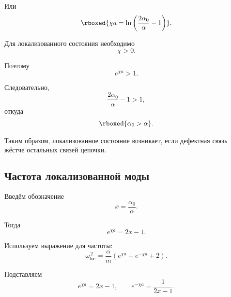 \documentclass[../final.tex]{subfiles}
\begin{document}
Или
%
\begin{equation*}
    \rboxed{
        \chi a
        =
        \ln
        \left(
            \frac{2\alpha_0}{\alpha}-1
        \right)
    }.
\end{equation*}

Для локализованного состояния необходимо
%
\begin{equation*}
    \chi>0.
\end{equation*}

Поэтому
%
\begin{equation*}
    e^{\chi a}>1.
\end{equation*}

Следовательно,
%
\begin{equation*}
    \frac{2\alpha_0}{\alpha}-1>1,
\end{equation*}
%
откуда
%
\begin{equation*}
    \rboxed{
        \alpha_0>\alpha
    }.
\end{equation*}

Таким образом, локализованное состояние возникает,
если дефектная связь жёстче остальных связей цепочки.



\subsection*{Частота локализованной моды}

Введём обозначение
%
\begin{equation*}
    x
    =
    \frac{\alpha_0}{\alpha}.
\end{equation*}

Тогда
%
\begin{equation*}
    e^{\chi a}
    =
    2x-1.
\end{equation*}

Используем выражение для частоты:
%
\begin{equation*}
    \omega_{\mathrm{loc}}^{\,2}
    =
    \frac{\alpha}{m}
    \left(
        e^{\chi a}
        +
        e^{-\chi a}
        +
        2
    \right).
\end{equation*}

Подставляем
%
\begin{equation*}
    e^{\chi a}=2x-1,
    \qquad
    e^{-\chi a}
    =
    \frac{1}{2x-1}.
\end{equation*}
\end{document}
